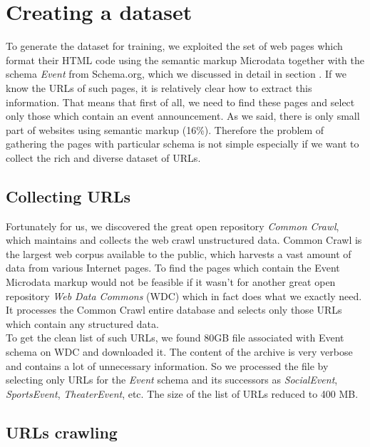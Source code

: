 \section{Creating a dataset}

To generate the dataset for training, we exploited the set of web pages which format their HTML code using the semantic markup Microdata together with the schema \textit{Event} from Schema.org, which we discussed in detail in section   . If we know the URLs of such pages, it is relatively clear how to extract this information. That means that first of all, we need to find these pages and select only those which contain an event announcement. As we said, there is only small part of websites using semantic markup (16\%). Therefore the problem of gathering the pages with particular schema is not simple especially if we want to collect the rich and diverse dataset of URLs. \\

\subsection{Collecting URLs}

Fortunately for us, we discovered the great open repository \textit{Common Crawl}, which maintains and collects the web crawl unstructured data. Common Crawl is the largest web corpus available to the public, which harvests a vast amount of data from various Internet pages. To find the pages which contain the Event Microdata markup would not be feasible if it wasn't for another great open repository \textit{Web Data Commons} (WDC) which in fact does what we exactly need. It processes the Common Crawl entire database and selects only those URLs which contain any structured data.\\

To get the clean list of such URLs, we found 80GB file associated with Event schema on WDC and downloaded it. The content of the archive is very verbose and contains a lot of unnecessary information. So we processed the file by selecting only URLs for the \textit{Event} schema and its successors as \textit{SocialEvent}, \textit{SportsEvent}, \textit{TheaterEvent}, etc. The size of the list of URLs reduced to 400 MB. 

\subsection{URLs crawling}
\label{sec:urlparse}

